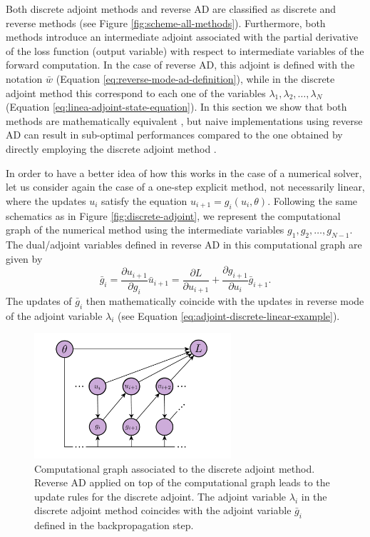 Both discrete adjoint methods and reverse AD are classified as discrete and reverse methods (see Figure \ref{fig:scheme-all-methods}). 
Furthermore, both methods introduce an intermediate adjoint associated with the partial derivative of the loss function (output variable) with respect to intermediate variables of the forward computation.
In the case of reverse AD, this adjoint is defined with the notation $\bar w$ (Equation \eqref{eq:reverse-mode-ad-definition}), while in the discrete adjoint method this correspond to each one of the variables $\lambda_1, \lambda_2, \ldots, \lambda_N$ (Equation \eqref{eq:linea-adjoint-state-equation}).
In this section we show that both methods are mathematically equivalent \cite{Zhu_Xu_Darve_Beroza_2021, li2020coupled}, but naive implementations using reverse AD can result in sub-optimal performances compared to the one obtained by directly employing the discrete adjoint method \cite{Alexe_Sandu_2009}. 

In order to have a better idea of how this works in the case of a numerical solver, let us consider again the case of a one-step explicit method, not necessarily linear, where the updates $u_{i}$ satisfy the equation $u_{i+1} = g_{i}(u_{i}, \theta)$.
Following the same schematics as in Figure \ref{fig:discrete-adjoint}, we represent the computational graph of the numerical method using the intermediate variables $g_1, g_2, \ldots, g_{N-1}$.
The dual/adjoint variables defined in reverse AD in this computational graph are given by 
\begin{equation}
    \bar g_i
    = 
    \frac{\partial u_{i+1}}{\partial g_i} \bar u_{i+1}
    = 
    \frac{\partial L}{\partial u_{i+1}} 
    +
    \frac{\partial g_{i+1}}{\partial u_i} \bar g_{i+1}.
\end{equation}
The updates of $\bar g_i$ then mathematically coincide with the updates in reverse mode of the adjoint variable $\lambda_i$ (see Equation \eqref{eq:adjoint-discrete-linear-example}).

\begin{figure}[t]
    \centering
    \includegraphics[width=0.65\textwidth]{figures/AD-discrete-adjoint.pdf}
    \caption{Computational graph associated to the discrete adjoint method. Reverse AD applied on top of the computational graph leads to the update rules for the discrete adjoint. The adjoint variable $\lambda_i$ in the discrete adjoint method coincides with the adjoint variable $\bar g_i$ defined in the backpropagation step.}
    \label{fig:ad-vs-discrete-adjoint}
\end{figure}

